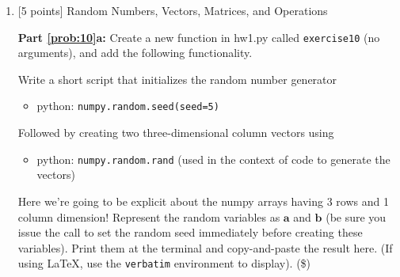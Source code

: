 \documentclass[10pt]{article}
\begin{document}
\begin{enumerate}
Finally, set the seed to 8 a second time, rerun your estimation procedure 10 times again and report whether you get the same result as the first 10 times (\$).

Explain why it is often important to have random number sequences that are not really random, and can be controlled (\$).

{\bf Solution.} First time got 26 out of 1000 trials(Probability= 0.026). When the random number generator is not reset the successive trails we get different values.
\begin{verbatim}
Trial  1 =  0.026
Trial  2 =  0.027
Trial  3 =  0.021
Trial  4 =  0.026
Trial  5 =  0.021
Trial  6 =  0.031
Trial  7 =  0.027
Trial  8 =  0.045
Trial  9 =  0.026
Trial  10 =  0.021
\end{verbatim}
Out of 10times, 3 times we get 0.026, same as the first trial. When we reset the seed to 8 again and do another 10trials, the same results are repeated! Hence setting a seed becomes important to regenerate your results. When repeated experiments are conducted it becomes important to be able to replicate your results and hence using random number sequences becomes important.  \\


\item \label{prob:10} [5 points] Random Numbers, Vectors, Matrices, and Operations

{\bf Part \ref{prob:10}a:} Create a new function in hw1.py called {\tt exercise10} (no arguments), and add the following functionality.

Write a short script that initializes the random number generator
\begin{itemize}
\item[] python: {\tt numpy.random.seed(seed=5)}
\end{itemize}
Followed by creating two three-dimensional column vectors using
\begin{itemize}
\item[] python: {\tt numpy.random.rand} (used in the context of code to generate the vectors)
\end{itemize}
Here we're going to be explicit about the numpy arrays having 3 rows and 1 column dimension!
Represent the random variables as $\mathbf{a}$ and $\mathbf{b}$ (be sure you issue the call to set the random seed immediately before creating these variables).  Print them at the terminal and copy-and-paste the result here. (If using \LaTeX, use the {\tt verbatim} environment to display). (\$)


\end{enumerate}
\end{document}
